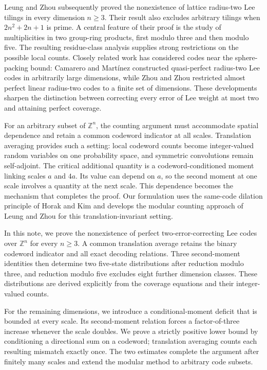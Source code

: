 \documentclass[12pt,letterpaper,onecolumn]{article}
\theoremstyle{definition}
\newcommand{\Z}{\mathbb{Z}}
\begin{document}
Leung and Zhou \cite{LeungZhou2020} subsequently proved the nonexistence of lattice radius-two Lee tilings in every dimension $n\ge3$. Their result also excludes arbitrary tilings when $2n^2+2n+1$ is prime. A central feature of their proof is the study of multiplicities in two group-ring products, first modulo three and then modulo five. The resulting residue-class analysis supplies strong restrictions on the possible local counts. Closely related work has considered codes near the sphere-packing bound: Camarero and Mart\'inez \cite{CamareroMartinez2016} constructed quasi-perfect radius-two Lee codes in arbitrarily large dimensions, while Zhou and Zhou \cite{ZhouZhou2024} restricted almost perfect linear radius-two codes to a finite set of dimensions. These developments sharpen the distinction between correcting every error of Lee weight at most two and attaining perfect coverage.

For an arbitrary subset of $\Z^n$, the counting argument must accommodate spatial dependence and retain a common codeword indicator at all scales. Translation averaging provides such a setting: local codeword counts become integer-valued random variables on one probability space, and symmetric convolutions remain self-adjoint. The critical additional quantity is a codeword-conditioned moment linking scales $a$ and $4a$. Its value can depend on $a$, so the second moment at one scale involves a quantity at the next scale. This dependence becomes the mechanism that completes the proof. Our formulation uses the same-code dilation principle of Horak and Kim \cite[Theorem~24 and Corollary~25]{HorakKim2018} and develops the modular counting approach of Leung and Zhou \cite[Section~3]{LeungZhou2020} for this translation-invariant setting.

In this note, we prove the nonexistence of perfect two-error-correcting Lee codes over $\Z^n$ for every $n\ge3$. A common translation average retains the binary codeword indicator and all exact decoding relations. Three second-moment identities then determine two five-state distributions after reduction modulo three, and reduction modulo five excludes eight further dimension classes. These distributions are derived explicitly from the coverage equations and their integer-valued counts.

For the remaining dimensions, we introduce a conditional-moment deficit that is bounded at every scale. Its second-moment relation forces a factor-of-three increase whenever the scale doubles. We prove a strictly positive lower bound by conditioning a directional sum on a codeword; translation averaging counts each resulting mismatch exactly once. The two estimates complete the argument after finitely many scales and extend the modular method to arbitrary code subsets.
\end{document}
